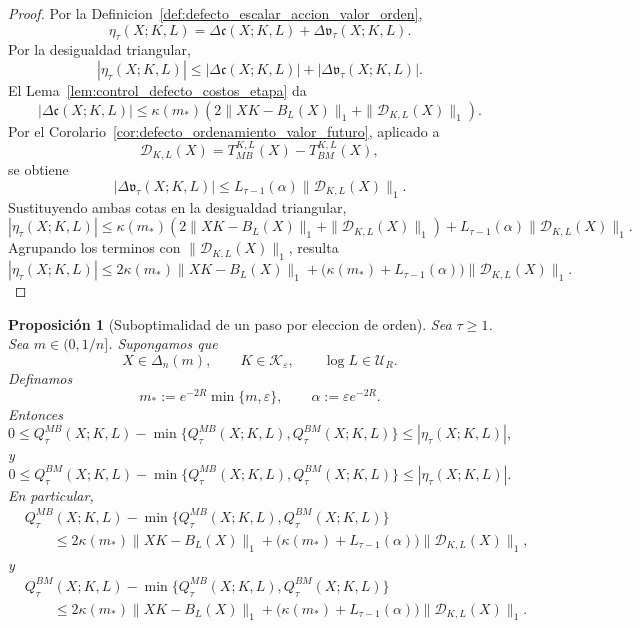 \documentclass[12pt]{article}
\newtheorem{proposicion}{Proposición}[section]
\begin{document}
\begin{proof}
Por la Definicion~\ref{def:defecto_escalar_accion_valor_orden},
\[
\eta_\tau(X;K,L)
=
\Delta\mathfrak c(X;K,L)
+
\Delta\mathfrak v_\tau(X;K,L).
\]
Por la desigualdad triangular,
\[
|\eta_\tau(X;K,L)|
\le
|\Delta\mathfrak c(X;K,L)|
+
|\Delta\mathfrak v_\tau(X;K,L)|.
\]
El Lema~\ref{lem:control_defecto_costos_etapa} da
\[
|\Delta\mathfrak c(X;K,L)|
\le
\kappa(m_*)
\left(
2\|XK-B_L(X)\|_1
+
\|\mathcal D_{K,L}(X)\|_1
\right).
\]
Por el Corolario~\ref{cor:defecto_ordenamiento_valor_futuro}, aplicado a
\[
\mathcal D_{K,L}(X)=T_{MB}^{K,L}(X)-T_{BM}^{K,L}(X),
\]
se obtiene
\[
|\Delta\mathfrak v_\tau(X;K,L)|
\le
L_{\tau-1}(\alpha)\|\mathcal D_{K,L}(X)\|_1.
\]
Sustituyendo ambas cotas en la desigualdad triangular,
\[
|\eta_\tau(X;K,L)|
\le
\kappa(m_*)
\left(
2\|XK-B_L(X)\|_1
+
\|\mathcal D_{K,L}(X)\|_1
\right)
+
L_{\tau-1}(\alpha)\|\mathcal D_{K,L}(X)\|_1.
\]
Agrupando los terminos con \(\|\mathcal D_{K,L}(X)\|_1\), resulta
\[
|\eta_\tau(X;K,L)|
\le
2\kappa(m_*)\|XK-B_L(X)\|_1
+
\bigl(\kappa(m_*)+L_{\tau-1}(\alpha)\bigr)
\|\mathcal D_{K,L}(X)\|_1.
\]
\end{proof}

\begin{proposicion}[Suboptimalidad de un paso por eleccion de orden]\label{prop:suboptimalidad_un_paso_eleccion_orden}
Sea \(\tau\ge 1\). Sea \(m\in(0,1/n]\). Supongamos que
\[
X\in\Delta_n(m),
\qquad
K\in\mathcal K_\varepsilon,
\qquad
\log L\in\mathcal U_R.
\]
Definamos
\[
m_*:=e^{-2R}\min\{m,\varepsilon\},
\qquad
\alpha:=\varepsilon e^{-2R}.
\]
Entonces
\[
0
\le
Q_\tau^{MB}(X;K,L)
-
\min\{Q_\tau^{MB}(X;K,L),Q_\tau^{BM}(X;K,L)\}
\le
|\eta_\tau(X;K,L)|,
\]
y
\[
0
\le
Q_\tau^{BM}(X;K,L)
-
\min\{Q_\tau^{MB}(X;K,L),Q_\tau^{BM}(X;K,L)\}
\le
|\eta_\tau(X;K,L)|.
\]
En particular,
\[
\begin{aligned}
&Q_\tau^{MB}(X;K,L)
-
\min\{Q_\tau^{MB}(X;K,L),Q_\tau^{BM}(X;K,L)\}
\\
&\qquad\le
2\kappa(m_*)\|XK-B_L(X)\|_1
+
\bigl(\kappa(m_*)+L_{\tau-1}(\alpha)\bigr)
\|\mathcal D_{K,L}(X)\|_1,
\end{aligned}
\]
y
\[
\begin{aligned}
&Q_\tau^{BM}(X;K,L)
-
\min\{Q_\tau^{MB}(X;K,L),Q_\tau^{BM}(X;K,L)\}
\\
&\qquad\le
2\kappa(m_*)\|XK-B_L(X)\|_1
+
\bigl(\kappa(m_*)+L_{\tau-1}(\alpha)\bigr)
\|\mathcal D_{K,L}(X)\|_1.
\end{aligned}
\]
\end{proposicion}
\end{document}
